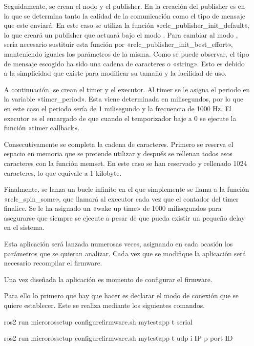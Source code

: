 \documentclass[a4paper,11pt,spanish]{sphinxmanual}
\begin{document}
\sphinxAtStartPar
Seguidamente, se crean el nodo y el publisher. En la creación del publisher es en
la que se determina tanto la calidad de la comunicación como el tipo de mensaje
que este enviará. En este caso se utiliza la función «rclc\_publisher\_init\_default»,
lo que creará un publisher que actuará bajo el modo . Para cambiar al
modo , sería necesario sustituir esta función por «rclc\_publisher\_init\_best\_effort»,
manteniendo iguales los parámetros de la misma. Como se puede observar, el tipo
de mensaje escogido ha sido una cadena de caracteres o «string». Esto es debido
a la simplicidad que existe para modificar su tamaño y la facilidad de uso.

\sphinxAtStartPar
A continuación, se crean el timer y el executor. Al timer se le asigna el periodo
en la variable «timer\_period». Esta viene determinada en milisegundos, por lo que
en este caso el periodo sería de 1 milisegundo y la frecuencia de 1000 Hz. El
executor es el encargado de que cuando el temporizador baje a 0 se ejecute
la función «timer callback».

\sphinxAtStartPar
Consecutivamente se completa la cadena de caracteres. Primero se reserva
el espacio en memoria que se pretende utilizar y después se rellenan
todos esos caracteres con la función memset. En este caso se han reservado
y rellenado 1024 caracteres, lo que equivale a 1 kilobyte.

\sphinxAtStartPar
Finalmente, se lanza un bucle infinito en el que simplemente se llama a la función
«rclc\_spin\_some», que llamará al executor cada vez que el contador del timer finalice.
Se le ha asignado un «wake up time» de 1000 milisegundos para asegurarse que
siempre se ejecute a pesar de que pueda existir un pequeño delay en el sistema.

\sphinxAtStartPar
Esta aplicación será lanzada numerosas veces, asignando en cada ocasión los
parámetros que se quieran analizar. Cada vez que se modifique la aplicación
será necesario recompilar el firmware.

\sphinxAtStartPar
Una vez diseñada la aplicación es momento de configurar el firmware.

\sphinxAtStartPar
Para ello lo primero que hay que hacer es declarar el modo de conexión que
se quiere establecer. Este se realiza mediante los siguientes comandos.

\begin{sphinxVerbatim}[commandchars=\\\{\},formatcom=\footnotesize]
ros2 run micro\PYGZus{}ros\PYGZus{}setup configure\PYGZus{}firmware.sh my\PYGZus{}test\PYGZus{}app \PYGZhy{}t serial

ros2 run micro\PYGZus{}ros\PYGZus{}setup configure\PYGZus{}firmware.sh my\PYGZus{}test\PYGZus{}app \PYGZhy{}t udp \PYGZhy{}i \PYG{o}{[}IP\PYG{o}{]} \PYGZhy{}p \PYG{o}{[}port ID\PYG{o}{]}
\end{sphinxVerbatim}
\end{document}
